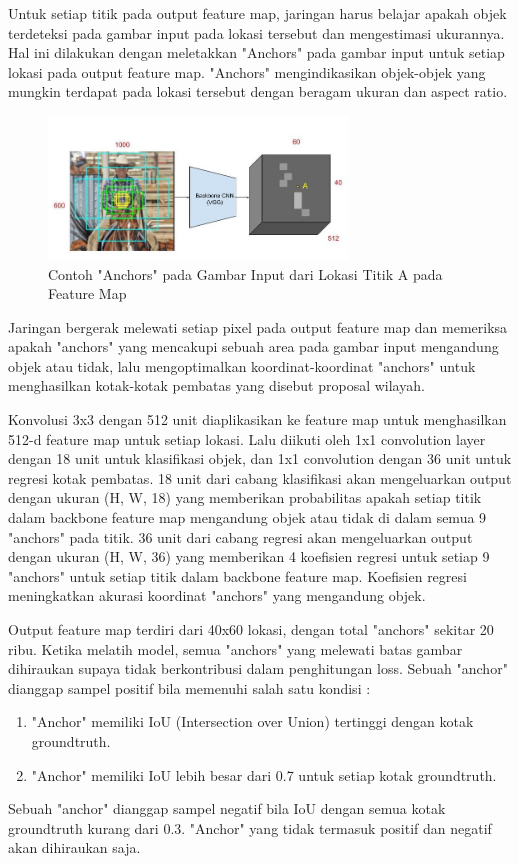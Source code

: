 \documentclass{article}
\begin{document}
  	 \par Untuk setiap titik pada output feature map, jaringan harus belajar apakah objek terdeteksi pada gambar input pada lokasi tersebut dan mengestimasi ukurannya. Hal ini dilakukan dengan meletakkan "Anchors" pada gambar input untuk setiap lokasi pada output feature map. "Anchors" mengindikasikan objek-objek yang mungkin terdapat pada lokasi tersebut dengan beragam ukuran dan aspect ratio. 
  	 
  	 \begin{figure}[H]
  	 	\centering
  	 	\includegraphics[width=300px]{arsitektur/contoh_anchor.jpeg}
  	 	\caption{Contoh "Anchors" pada Gambar Input dari Lokasi Titik A pada Feature Map}
  	 \end{figure}
   
   	\par Jaringan bergerak melewati setiap pixel pada output feature map dan memeriksa apakah "anchors" yang mencakupi sebuah area pada gambar input mengandung objek atau tidak, lalu mengoptimalkan koordinat-koordinat "anchors" untuk menghasilkan kotak-kotak pembatas yang disebut proposal wilayah.
   	
   	\par Konvolusi 3x3 dengan 512 unit diaplikasikan ke feature map untuk menghasilkan 512-d feature map untuk setiap lokasi. Lalu diikuti oleh 1x1 convolution layer dengan 18 unit untuk klasifikasi objek, dan 1x1 convolution dengan 36 unit untuk regresi kotak pembatas. 18 unit dari cabang klasifikasi akan mengeluarkan output dengan ukuran (H, W, 18) yang memberikan probabilitas apakah setiap titik dalam backbone feature map mengandung objek atau tidak di dalam semua 9 "anchors" pada titik. 36 unit dari cabang regresi akan mengeluarkan output dengan ukuran (H, W, 36) yang memberikan 4 koefisien regresi  untuk setiap 9 "anchors" untuk setiap titik dalam backbone feature map. Koefisien regresi meningkatkan akurasi koordinat "anchors" yang mengandung objek.
   	
   	\par Output feature map terdiri dari 40x60 lokasi, dengan total "anchors" sekitar 20 ribu. Ketika melatih model, semua "anchors" yang melewati batas gambar dihiraukan supaya tidak berkontribusi dalam penghitungan loss. Sebuah "anchor" dianggap sampel positif bila memenuhi salah satu kondisi :
   	\begin{enumerate}
   		\item "Anchor" memiliki IoU (Intersection over Union) tertinggi dengan kotak groundtruth.
   		\item "Anchor" memiliki IoU lebih besar dari 0.7 untuk setiap kotak groundtruth.
   	\end{enumerate}
   	Sebuah "anchor" dianggap sampel negatif bila IoU dengan semua kotak groundtruth kurang dari 0.3. "Anchor" yang tidak termasuk positif dan negatif akan dihiraukan saja.
   	
\end{document}
